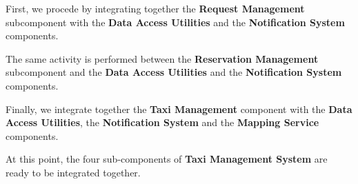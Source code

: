 First, we procede by integrating together the \textbf{Request Management} subcomponent with the \textbf{Data Access Utilities} and the \textbf{Notification System} components.
\begin{figure}[H]
\centering
{}
\end{figure}
The same activity is performed between the \textbf{Reservation Management} subcomponent and the \textbf{Data Access Utilities} and the \textbf{Notification System} components.
\begin{figure}[H]
\centering
{}
\end{figure}
Finally, we integrate together the \textbf{Taxi Management} component with the \textbf{Data Access Utilities}, the \textbf{Notification System} and the \textbf{Mapping Service} components.
\begin{figure}[H]
\centering
{}
\end{figure}
At this point, the four sub-components of \textbf{Taxi Management System} are ready to be integrated together.
\begin{figure}[H]
\centering
{}
\end{figure}
